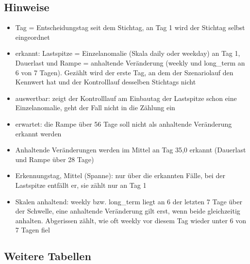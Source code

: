 \subsection*{Hinweise}
\begin{itemize}
\item Tag = Entscheidungstag seit dem Stichtag, an Tag 1 wird der Stichtag selbst eingeordnet
\item erkannt: Lastspitze = Einzelanomalie (Skala daily oder weekday) an Tag 1, Dauerlast und Rampe = anhaltende Veränderung (weekly und long\_\allowbreak{}term an 6 von 7 Tagen). Gezählt wird der erste Tag, an dem der Szenariolauf den Kennwert hat und der Kontrolllauf desselben Stichtags nicht
\item auswertbar: zeigt der Kontrolllauf am Einbautag der Lastspitze schon eine Einzelanomalie, geht der Fall nicht in die Zählung ein
\item erwartet: die Rampe über 56 Tage soll nicht als anhaltende Veränderung erkannt werden
\item Anhaltende Veränderungen werden im Mittel an Tag 35,0 erkannt (Dauerlast und Rampe über 28 Tage)
\item Erkennungstag, Mittel (Spanne): nur über die erkannten Fälle, bei der Lastspitze entfällt er, sie zählt nur an Tag 1
\item Skalen anhaltend: weekly bzw. long\_\allowbreak{}term liegt an 6 der letzten 7 Tage über der Schwelle, eine anhaltende Veränderung gilt erst, wenn beide gleichzeitig anhalten. Abgerissen zählt, wie oft weekly vor diesem Tag wieder unter 6 von 7 Tagen fiel
\end{itemize}

\subsection*{Weitere Tabellen}

